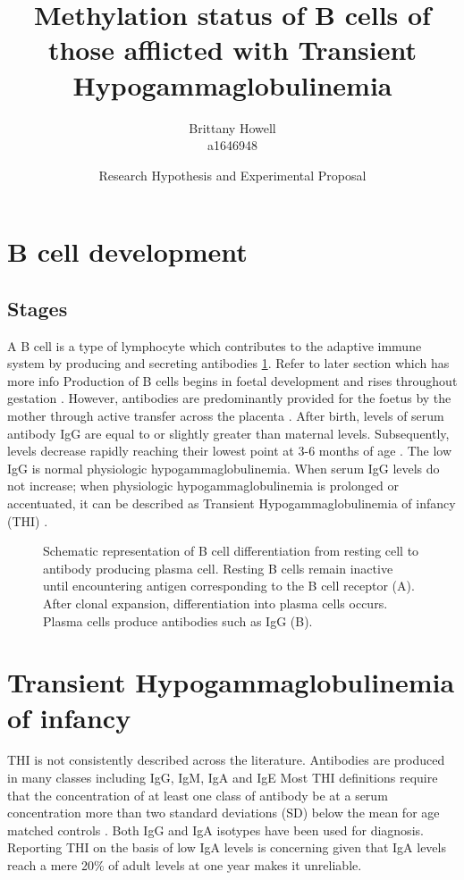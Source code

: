 \documentclass[12pt]{article}
\title{Methylation status of B cells of those afflicted with Transient Hypogammaglobulinemia}
\date{Research Hypothesis and Experimental Proposal}
\author{Brittany Howell \\ a1646948}
\begin{document}
	\maketitle
	
	\section{B cell development}
		
		\subsection{Stages}
			
			A B cell is a type of lymphocyte which contributes to the adaptive immune system by producing and secreting antibodies \citep{Cooper15} \ref{fig:BcellDiff}.
			{\Huge Refer to later section which has more info}
			Production of B cells begins in foetal development and rises throughout gestation \citep{Rechavi15}.
			However, antibodies are predominantly provided for the foetus by the mother through active transfer across the placenta \citep{Kohler66, Dalal98}.
			After birth, levels of serum antibody IgG are equal to or slightly greater than maternal levels. 
			Subsequently, levels decrease rapidly reaching their lowest point at 3-6 months of age \citep{Dressler89}.
			The low IgG is normal physiologic hypogammaglobulinemia.
			When serum IgG levels do not increase; when physiologic hypogammaglobulinemia is prolonged or accentuated, it can be described as Transient Hypogammaglobulinemia of infancy (THI) \citep{Gitlin56}.
			
			\begin{figure}[tbh]
				\centering
				\caption{Schematic representation of B cell differentiation from resting cell to antibody producing plasma cell. Resting B cells remain inactive until encountering antigen corresponding to the B cell receptor (A). After clonal expansion, differentiation into plasma cells occurs. Plasma cells produce antibodies such as IgG (B).}
				\label{fig:BcellDiff}
			\end{figure}
			
	
	\section{Transient Hypogammaglobulinemia of infancy}
		
		THI is not consistently described across the literature. 
		Antibodies are produced in many classes including IgG, IgM, IgA and IgE \citep{Cooper15}
		Most THI definitions require that the concentration of at least one class of antibody be at a serum concentration more than two standard deviations (SD) below the mean for age matched controls \citep{Tiller78,McGeady87,Dressler89,Dalal98}. 
		Both IgG and IgA isotypes have been used for diagnosis. 
		Reporting THI on the basis of low IgA levels is concerning given that IgA levels reach a mere 20\% of adult levels at one year \citep{Wilson96} makes it unreliable.
		
\end{document}
